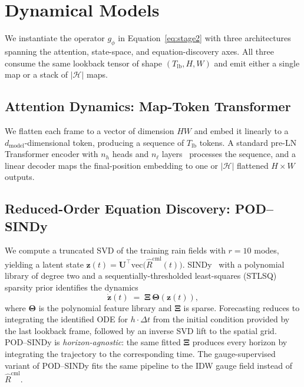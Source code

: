 \documentclass[conference]{IEEEtran}
\begin{document}
\section{Dynamical Models}
\label{sec:methods}

We instantiate the operator $g_\phi$ in
Equation~\eqref{eq:stage2} with three architectures spanning the
attention, state-space, and equation-discovery axes. All three consume
the same lookback tensor of shape
$(T_{\mathrm{lb}},H,W)$ and emit either a single map or a stack of
$|\mathcal{H}|$ maps.

\subsection{Attention Dynamics: Map-Token Transformer}

We flatten each frame to a vector of dimension $HW$ and embed it
linearly to a $d_\mathrm{model}$-dimensional token, producing a sequence
of $T_{\mathrm{lb}}$ tokens. A standard pre-LN Transformer encoder with
$n_h$ heads and $n_\ell$ layers~\cite{vaswani2017} processes the
sequence, and a linear decoder maps the final-position embedding to one
or $|\mathcal{H}|$ flattened $H\!\times\!W$ outputs.

\subsection{Reduced-Order Equation Discovery: POD--SINDy}

We compute a truncated SVD of the training rain fields with $r=10$
modes, yielding a latent state
$\mathbf{z}(t)=\mathbf{U}^{\!\top}\mathrm{vec}\bigl(\widehat{R}^{\mathrm{cml}}(t)\bigr)$.
SINDy~\cite{brunton2016sindy} with a polynomial library of degree two
and a sequentially-thresholded least-squares (STLSQ) sparsity prior
identifies the dynamics
\begin{equation}
  \dot{\mathbf{z}}(t) \;=\; \mathbf{\Xi}\,\boldsymbol{\Theta}(\mathbf{z}(t)),
\end{equation}
where $\boldsymbol{\Theta}$ is the polynomial feature library and
$\mathbf{\Xi}$ is sparse. Forecasting reduces to integrating the
identified ODE for $h\!\cdot\!\Delta t$ from the initial condition
provided by the last lookback frame, followed by an inverse SVD lift to
the spatial grid. POD--SINDy is \emph{horizon-agnostic}: the same fitted
$\mathbf{\Xi}$ produces every horizon by integrating the trajectory to
the corresponding time. The gauge-supervised variant of POD--SINDy fits
the same pipeline to the IDW gauge field instead of
$\widehat{R}^{\mathrm{cml}}$.
\end{document}
